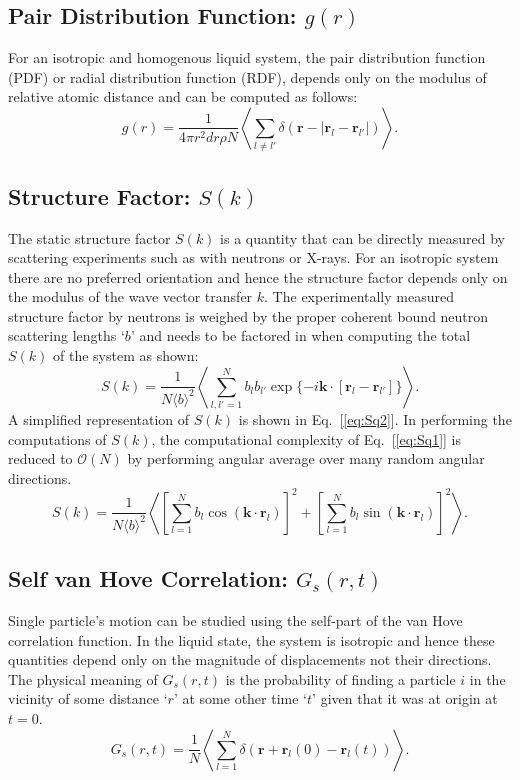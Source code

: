 \documentclass{article}
\begin{document}
\subsection{Pair Distribution Function: $g(r)$} \label{sec::gofr}
For an isotropic and homogenous liquid system, the pair distribution function (PDF) or radial distribution function (RDF), depends only on the modulus of relative atomic distance and can be computed as follows:
\begin{equation}
g(r) = \frac{1}{4\pi r^2dr\rho N}\left\langle\sum\limits_{l\neq l'} \delta(\mathbf{r}-|\mathbf{r}_l-\mathbf{r}_{l'}|)\right\rangle.
\end{equation}

\subsection{Structure Factor: $S(k)$} \label{sec::sofk}
The static structure factor $S(k)$ is a quantity that can be directly measured by scattering experiments such as with neutrons or X-rays. For an isotropic system there are no preferred orientation and hence the structure factor depends only on the modulus of the wave vector transfer $k$. The experimentally measured structure factor by neutrons is weighed by the proper coherent bound neutron scattering lengths `$b$' and needs to be factored in when computing the total $S(k)$ of the system as shown:
\begin{equation}
\label{eq:Sq1}
S(k) = \frac{1}{N\langle b\rangle^2}\left\langle\sum_{l,l'=1}^{N} b_lb_{l'}\exp{\{-i\mathbf{k}\cdot[\mathbf{r}_l - \mathbf{r}_{l'}]\}}\right\rangle.
\end{equation}
A simplified representation of $S(k)$ is shown in Eq.~[\ref{eq:Sq2}]. In performing the computations of $S(k)$, the computational complexity of Eq.~[\ref{eq:Sq1}] is reduced to $\mathcal{O}(N)$ by performing angular average over many random angular directions.
\begin{equation}
\label{eq:Sq2}
S(k) = \frac{1}{N\langle b\rangle^2}\left\langle\left[\sum_{l=1}^{N} b_l\cos(\mathbf{k}\cdot\mathbf{r}_l)\right]^2+\left[\sum_{l=1}^{N} b_l\sin(\mathbf{k}\cdot\mathbf{r}_l)\right]^2\right\rangle.
\end{equation} 

\subsection{Self van Hove Correlation: $G_s(r,t)$} \label{sec::Gofrt}
Single particle's motion can be studied using the self-part of the van Hove correlation function. In the liquid state, the system is isotropic and hence these quantities depend only on the magnitude of displacements not their directions. The physical meaning of $G_s(r,t)$ is the probability of finding a particle $i$ in the vicinity of some distance `$r$' at some other time `$t$' given that it was at origin at $t = 0$.
\begin{equation}
\label{eq:gr}
G_s(r,t) = \frac{1}{N}\left\langle\sum\limits_{l=1}^N \delta(\mathbf{r}+\mathbf{r}_l(0)-\mathbf{r}_l(t))\right\rangle.
\end{equation}
\end{document}
